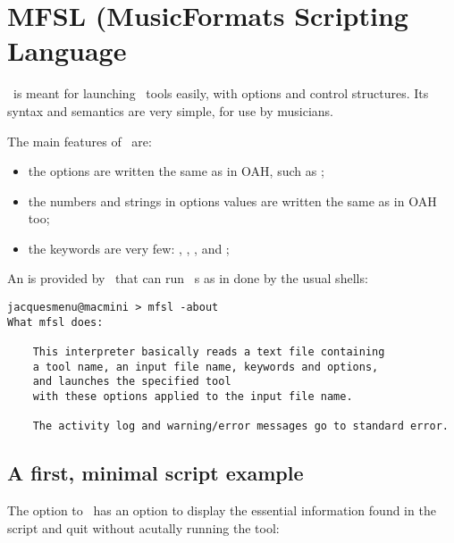 
\chapter{MFSL (MusicFormats Scripting Language}

\mfslLang\ is meant for launching \mf\ tools easily, with options and control structures. Its syntax and semantics are very simple, for use by musicians.

The main features of \mfslLang\ are:
\begin{itemize}
\item the options are written the same as in OAH, such as ;

\item the numbers and strings in options values are written the same as in OAH too;

\item the keywords are very few: , , ,  and ;
\end{itemize}

An  is provided by \mf\, that can run \mfslLang\ \script s as in done by the usual shells:
\begin{lstlisting}[language=Terminal]
jacquesmenu@macmini > mfsl -about
What mfsl does:

    This interpreter basically reads a text file containing
    a tool name, an input file name, keywords and options,
    and launches the specified tool
    with these options applied to the input file name.

    The activity log and warning/error messages go to standard error.
\end{lstlisting}


\section{A first, minimal script example}

The  option to \mfslI\ has an option to display the essential information found in the script and quit without acutally running the tool:
\begin{lstlisting}[language=Terminal]

\end{lstlisting}

